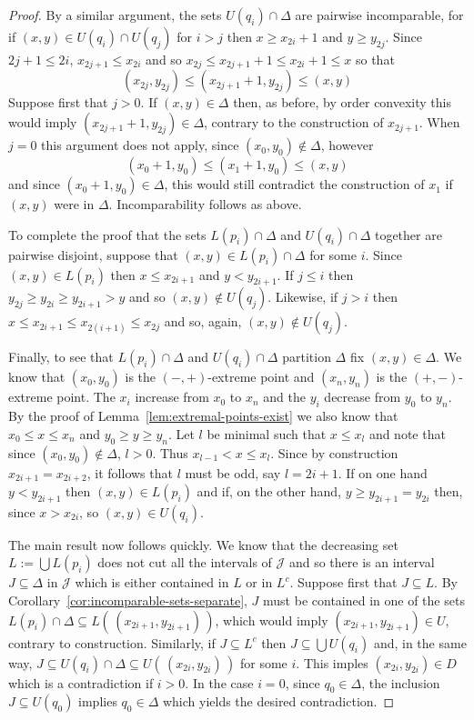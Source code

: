 \documentclass[10pt, a4paper]{article}
\theoremstyle{plain}
\theoremstyle{definition}
\newcommand{\J}{\mathcal{J}}
\begin{document}
\begin{proof}
  By a similar argument, the sets $U(q_i)\cap\Delta$ are pairwise incomparable, for if
  $(x,y)\in U(q_i)\cap U(q_j)$ for $i>j$ then $x\ge x_{2i}+1$ and
  $y\ge y_{2j}$. Since $2j+1 \le 2i$, $x_{2j+1}\le x_{2i}$ and so
  $x_{2j}\le x_{2j+1} + 1 \le x_{2i} + 1 \le x$ so that
  \[
    (x_{2j}, y_{2j}) \le (x_{2j+1}+1, y_{2j}) \le (x,y)
  \]
  Suppose first that $j>0$.
  If $(x,y)\in\Delta$ then, as before, by order convexity this would imply
  $(x_{2j+1}+1, y_{2j})\in\Delta$, contrary to the construction of $x_{2j+1}$.
  When $j=0$ this argument does not apply, since $(x_0, y_0)\not\in\Delta$, however
  \[
    (x_0+1, y_0) \le (x_1 +1, y_0)\le (x,y)
  \]
  and since $(x_0+1, y_0)\in\Delta$, this would still contradict the construction of
  $x_1$ if $(x,y)$ were in $\Delta$. Incomparability follows as above.

  To complete the proof that the sets $L(p_i)\cap\Delta$ and $U(q_i)\cap\Delta$ together
  are pairwise disjoint, suppose that $(x,y)\in L(p_i)\cap \Delta$ for some
  $i$. Since $(x,y)\in L(p_i)$ then $x\le x_{2i+1}$ and $y< y_{2i+1}$.
  If $j\le i$ then $y_{2j}\ge y_{2i}\ge y_{2i+1}>y$ and so $(x,y)\not\in U(q_j)$.
  Likewise, if $j>i$ then $x\le x_{2i+1}\le x_{2(i+1)}\le x_{2j}$ and so, again,
  $(x,y)\not\in U(q_j)$.

  Finally, to see that $L(p_i)\cap\Delta$ and $U(q_i)\cap\Delta$ partition $\Delta$
  fix $(x,y)\in\Delta$.
  We know that $(x_0,y_0)$ is the $(-,+)$-extreme point and $(x_n, y_n)$ is the
  $(+,-)$-extreme point. The $x_i$ increase from $x_0$ to $x_n$ and the $y_i$ decrease
  from $y_0$ to $y_n$. By the proof of Lemma~\ref{lem:extremal-points-exist}
  we also know that $x_0\le x\le x_n$ and $y_0\ge y\ge y_n$. Let $l$ be minimal
  such that $x\le x_l$ and note that since $(x_0, y_0)\not\in\Delta$, $l>0$.
  Thus $x_{l-1} < x \le x_l$.
  Since by construction $x_{2i+1} = x_{2i+2}$, it follows that $l$ must be odd, say $l=2i+1$.
  If on one hand $y < y_{2i+1}$ then $(x,y)\in L(p_i)$ and if, on the other hand,
  $y\ge y_{2i+1} = y_{2i}$ then, since $x > x_{2i}$, so
  $(x,y)\in U(q_i)$.

  The main result now follows quickly. We know that the decreasing set $L := \bigcup L(p_i)$
  does not cut all the intervals of $\J$ and so there is an interval
  $J\subseteq\Delta$ in $\J$ which is either contained in $L$ or in $L^c$.
  Suppose first that $J\subseteq L$. By Corollary~\ref{cor:incomparable-sets-separate},
  $J$ must be contained in one of the sets $L(p_i)\cap\Delta\subseteq L(\,(x_{2i+1}, y_{2i+1})\,)$,
  which would imply $(x_{2i+1}, y_{2i+1})\in U$, contrary to construction. Similarly,
  if $J\subseteq L^c$ then $J\subseteq \bigcup U(q_i)$ and, in the same way,
  $J\subseteq U(q_i)\cap\Delta\subseteq U(\,(x_{2i}, y_{2i})\,)$ for some $i$.
  This imples $(x_{2i}, y_{2i})\in D$ which is a contradiction if $i>0$. In the
  case $i=0$, since $q_0\in\Delta$, the inclusion $J\subseteq U(q_0)$ implies
  $q_0\in\Delta$ which yields the desired
  contradiction.
\end{proof}
\end{document}
